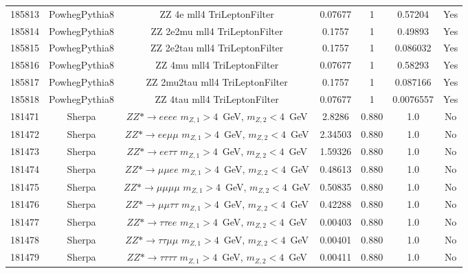 \begin{table}[ht!]
\begin{footnotesize}
\begin{tabular}{c|c|c|c|c|c|c}
185813 & PowhegPythia8& ZZ 4e mll4 TriLeptonFilter & 0.07677 & 1 & 0.57204 & Yes \\
185814 & PowhegPythia8& ZZ 2e2mu mll4 TriLeptonFilter & 0.1757 & 1 & 0.49893 & Yes \\
185815 & PowhegPythia8& ZZ 2e2tau mll4 TriLeptonFilter & 0.1757 & 1 & 0.086032 & Yes \\
185816 & PowhegPythia8& ZZ 4mu mll4 TriLeptonFilter & 0.07677 & 1 & 0.58293 & Yes \\
185817 & PowhegPythia8& ZZ 2mu2tau mll4 TriLeptonFilter & 0.1757 & 1 & 0.087166 & Yes \\
185818 & PowhegPythia8& ZZ 4tau mll4 TriLeptonFilter & 0.07677 & 1 & 0.0076557 & Yes \\

181471 & Sherpa & $ZZ*\rightarrow eeee$  $m_{Z,1} > 4$~GeV, $m_{Z,2} < 4$~GeV  & 2.8286 & 0.880 & 1.0 & No \\
181472 & Sherpa & $ZZ*\rightarrow ee\mu\mu$ $m_{Z,1} > 4$~GeV, $m_{Z,2} < 4$~GeV  & 2.34503 & 0.880 & 1.0 & No \\
181473 & Sherpa & $ZZ*\rightarrow ee\tau\tau$ $m_{Z,1} > 4$~GeV, $m_{Z,2} < 4$~GeV  & 1.59326 & 0.880 & 1.0 & No \\
181474 & Sherpa & $ZZ*\rightarrow \mu\mu ee$ $m_{Z,1} > 4$~GeV, $m_{Z,2} < 4$~GeV  & 0.48613 & 0.880 & 1.0 & No \\
181475 & Sherpa & $ZZ*\rightarrow \mu\mu\mu\mu$ $m_{Z,1} > 4$~GeV, $m_{Z,2} < 4$~GeV  & 0.50835 & 0.880 & 1.0 & No \\
181476 & Sherpa & $ZZ*\rightarrow \mu\mu\tau\tau$ $m_{Z,1} > 4$~GeV, $m_{Z,2} < 4$~GeV  & 0.42288 & 0.880 & 1.0 & No \\
181477 & Sherpa & $ZZ*\rightarrow \tau\tau ee$ $m_{Z,1} > 4$~GeV, $m_{Z,2} < 4$~GeV  & 0.00403 & 0.880 & 1.0 & No \\
181478 & Sherpa & $ZZ*\rightarrow \tau\tau\mu\mu$ $m_{Z,1} > 4$~GeV, $m_{Z,2} < 4$~GeV  & 0.00401 & 0.880 & 1.0 & No \\
181479 & Sherpa & $ZZ*\rightarrow \tau\tau\tau\tau$ $m_{Z,1} > 4$~GeV, $m_{Z,2} < 4$~GeV  & 0.00411 & 0.880 & 1.0 & No \\



\end{tabular}
\end{footnotesize}
\end{table}
